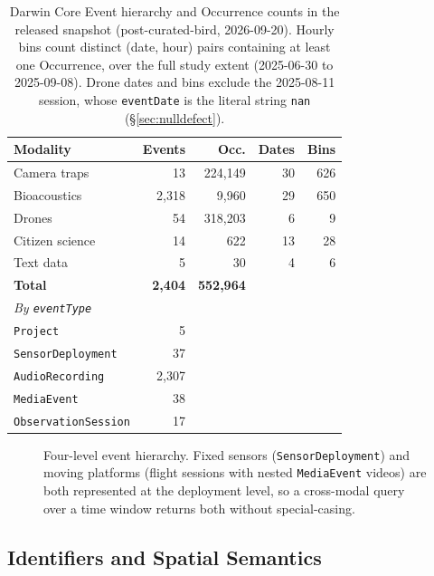 \documentclass[sigconf]{acmart}
\begin{document}
\begin{table}[t]
\caption{Darwin Core Event hierarchy and Occurrence counts in the
released snapshot (post-curated-bird, 2026-09-20). Hourly bins count
distinct (date, hour) pairs containing at least one Occurrence, over
the full study extent (2025-06-30 to 2025-09-08). Drone dates and bins
exclude the 2025-08-11 session, whose \texttt{eventDate} is the literal
string \texttt{nan} (\S\ref{sec:nulldefect}).}
\label{tab:schema}
\small
\begin{tabular}{lrrrr}
\toprule
\textbf{Modality} & \textbf{Events} & \textbf{Occ.} & \textbf{Dates} & \textbf{Bins} \\
\midrule
Camera traps & 13 & 224{,}149 & 30 & 626 \\
Bioacoustics & 2{,}318 & 9{,}960 & 29 & 650 \\
Drones & 54 & 318{,}203 & 6 & 9 \\
Citizen science & 14 & 622 & 13 & 28 \\
Text data & 5 & 30 & 4 & 6 \\
\midrule
\textbf{Total} & \textbf{2{,}404} & \textbf{552{,}964} & & \\
\midrule
\multicolumn{5}{l}{\emph{By \texttt{eventType}}} \\
\texttt{Project} & 5 & & & \\
\texttt{SensorDeployment} & 37 & & & \\
\texttt{AudioRecording} & 2{,}307 & & & \\
\texttt{MediaEvent} & 38 & & & \\
\texttt{ObservationSession} & 17 & & & \\
\bottomrule
\end{tabular}
\end{table}

\begin{figure}[t]
    \centering
    \caption{Four-level event hierarchy. Fixed sensors
    (\texttt{SensorDeployment}) and moving platforms (flight sessions
    with nested \texttt{MediaEvent} videos) are both represented at the
    deployment level, so a cross-modal query over a time window returns
    both without special-casing.}
    \label{fig:hierarchy}
\end{figure}

\subsection{Identifiers and Spatial Semantics}
\label{sec:identifiers}
\end{document}
